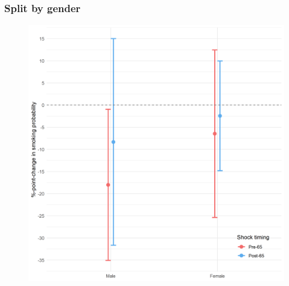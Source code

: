 \documentclass[10pt,compress,xcolor=dvipsnames,aspectratio=169]{beamer}    %
\newcounter{ex}
\newcommand{\1}[1]{\mathrm{1\hspace*{-2.5pt}l}[#1]}	%
\begin{document}
\begin{frame}
\frametitle{Split by gender}

\begin{figure}[hbtp]
\centering
\includegraphics[height=0.8\textheight]{../../3_output/shock_effects/female_6070_100_cvplot.png}
\label{fig:female}
\end{figure}
\hyperlink{frame:otherX}{}
\end{frame}
\end{document}
